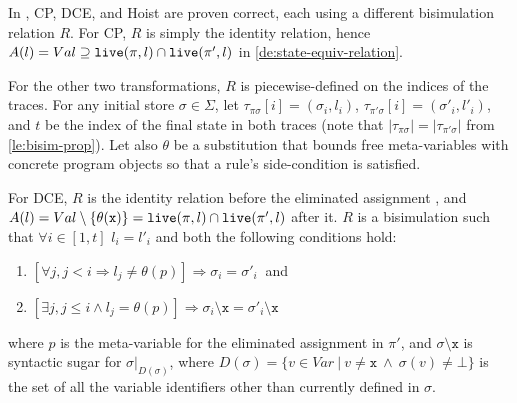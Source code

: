 \begin{myproof}
In \cite{Lacey02}, CP, DCE, and Hoist are proven correct, each using a different bisimulation relation $R$. 
For CP, $R$ is simply the identity relation, hence $A(l)=Val\supseteq \text{${\tt live}$}(\pi,l)\cap \text{${\tt live}$}(\pi',l)$ in \mydefinition\ref{de:state-equiv-relation}.

For the other two transformations, $R$ is piecewise-defined on the indices of the traces. For any initial store $\sigma\in \Sigma$, let $\tau_{\pi\sigma}[i]=(\sigma_i,l_i)$, $\tau_{\pi'\sigma}[i]=(\sigma'_i,l'_i)$, and $t$ be the index of the final state in both traces (note that $|\tau_{\pi\sigma}|=|\tau_{\pi'\sigma}|$ from \ref{le:bisim-prop}). Let also $\theta$ be a substitution that bounds free meta-variables with concrete program objects so that a rule's side-condition is satisfied.

For DCE, $R$ is the identity relation before the eliminated assignment , and $A(l)=Val\setminus\{\theta(\text{${\tt x}$})\}=\text{${\tt live}$}(\pi,l)\cap \text{${\tt live}$}(\pi',l)$ after it. $R$ is a bisimulation such that $\forall i\in[1,t]$ $l_i=l'_i$ and both the following conditions hold:
\begin{enumerate}
 \item $[\forall j, j<i \Rightarrow l_j\neq \theta(p)] \Rightarrow \sigma_i=\sigma'_i~$ and
 \item $[\exists j, j\leq i \wedge l_j = \theta(p)] \Rightarrow \sigma_i\setminus\texttt{x}=\sigma'_i\setminus\texttt{x}$
\end{enumerate}
\noindent where $p$ is the meta-variable for the eliminated assignment in $\pi'$, and $\sigma\setminus\texttt{x}$ is syntactic sugar for $\sigma\vert_{D(\sigma)}$, where $D(\sigma)=\{v\in Var ~|~ v\neq \texttt{x} ~\wedge~ \sigma(v)\neq\bot\}$ is the set of all the variable identifiers other than  currently defined in $\sigma$.


\end{myproof}
